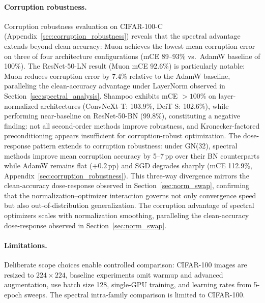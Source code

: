 \paragraph{Corruption robustness.}
Corruption robustness evaluation on CIFAR-100-C (Appendix~\ref{sec:corruption_robustness}) reveals that the spectral advantage extends beyond clean accuracy: Muon achieves the lowest mean corruption error on three of four architecture configurations (mCE 89--93\% vs.\ AdamW baseline of 100\%).
The ResNet-50-LN result (Muon mCE 92.6\%) is particularly notable: Muon reduces corruption error by 7.4\% relative to the AdamW baseline, paralleling the clean-accuracy advantage under LayerNorm observed in Section~\ref{sec:spectral_analysis}.
Shampoo exhibits mCE $>100\%$ on layer-normalized architectures (ConvNeXt-T: 103.9\%, DeiT-S: 102.6\%), while performing near-baseline on ResNet-50-BN (99.8\%), constituting a negative finding: not all second-order methods improve robustness, and Kronecker-factored preconditioning appears insufficient for corruption-robust optimization.
The dose-response pattern extends to corruption robustness: under GN(32), spectral methods improve mean corruption accuracy by 5--7\,pp over their BN counterparts while AdamW remains flat ($+0.2$\,pp) and SGD degrades sharply (mCE 112.9\%, Appendix~\ref{sec:corruption_robustness}).
This three-way divergence mirrors the clean-accuracy dose-response observed in Section~\ref{sec:norm_swap}, confirming that the normalization--optimizer interaction governs not only convergence speed but also out-of-distribution generalization.
The corruption advantage of spectral optimizers scales with normalization smoothing, paralleling the clean-accuracy dose-response observed in Section~\ref{sec:norm_swap}.

\paragraph{Limitations.}
\label{sec:limitations}
Deliberate scope choices enable controlled comparison: CIFAR-100 images are resized to $224{\times}224$, baseline experiments omit warmup and advanced augmentation, use batch size 128, single-GPU training, and learning rates from 5-epoch sweeps. The spectral intra-family comparison is limited to CIFAR-100.

